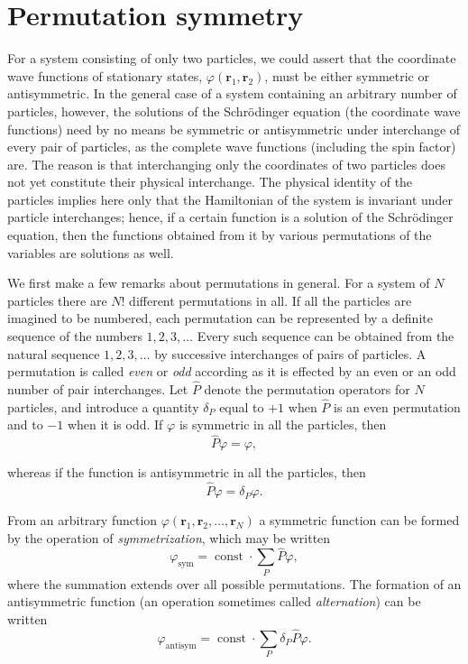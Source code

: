 \section{Permutation symmetry}

For a system consisting of only two particles, we could assert that the coordinate wave functions of stationary states, $\varphi(\mathbf r_1,\mathbf r_2)$, must be either symmetric or antisymmetric. In the general case of a system containing an arbitrary number of particles, however, the solutions of the Schrödinger equation (the coordinate wave functions) need by no means be symmetric or antisymmetric under interchange of every pair of particles, as the complete wave functions (including the spin factor) are. The reason is that interchanging only the coordinates of two particles does not yet constitute their physical interchange. The physical identity of the particles implies here only that the Hamiltonian of the system is invariant under particle interchanges; hence, if a certain function is a solution of the Schrödinger equation, then the functions obtained from it by various permutations of the variables are solutions as well.

We first make a few remarks about permutations in general. For a system of $N$ particles there are $N!$ different permutations in all. If all the particles are imagined to be numbered, each permutation can be represented by a definite sequence of the numbers $1,2,3,\ldots$ Every such sequence can be obtained from the natural sequence $1,2,3,\ldots$ by successive interchanges of pairs of particles. A permutation is called \emph{even} or \emph{odd} according as it is effected by an even or an odd number of pair interchanges. Let $\widehat P$ denote the permutation operators for $N$ particles, and introduce a quantity $\delta_P$ equal to $+1$ when $\widehat P$ is an even permutation and to $-1$ when it is odd. If $\varphi$ is symmetric in all the particles, then
\[
 \widehat P\varphi=\varphi,
\]

whereas if the function is antisymmetric in all the particles, then
\[
 \widehat P\varphi=\delta_P\varphi.
\]

From an arbitrary function $\varphi(\mathbf r_1,\mathbf r_2,\ldots,\mathbf r_N)$ a symmetric function can be formed by the operation of \emph{symmetrization}, which may be written
\begin{equation}
 \varphi_{\text{sym}}=\operatorname{const}\cdot\sum_P\widehat P\varphi,
 \tag{63.1}
\end{equation}
where the summation extends over all possible permutations. The formation of an antisymmetric function (an operation sometimes called \emph{alternation}) can be written
\begin{equation}
 \varphi_{\text{antisym}}=\operatorname{const}\cdot\sum_P\delta_P\widehat P\varphi.
 \tag{63.2}
\end{equation}

